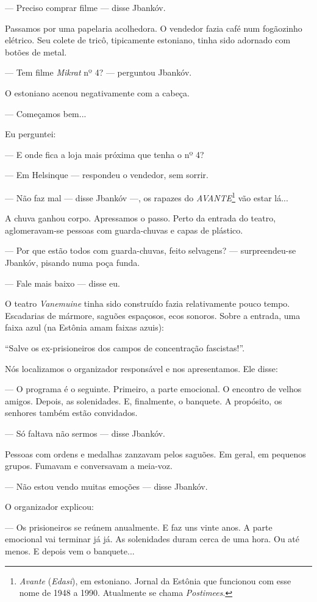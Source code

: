 --- Preciso comprar filme --- disse Jbankóv.

Passamos por uma papelaria acolhedora. O vendedor fazia café num
fogãozinho elétrico. Seu colete de tricô, tipicamente estoniano, tinha
sido adornado com botões de metal.

--- Tem filme \emph{Mikrat} nº 4? --- perguntou Jbankóv.

O estoniano acenou negativamente com a cabeça.

--- Começamos bem...

Eu perguntei:

--- E onde fica a loja mais próxima que tenha o nº 4?

--- Em Helsinque --- respondeu o vendedor, sem sorrir.

--- Não faz mal --- disse Jbankóv ---, os rapazes do
\emph{AVANTE}\footnote{\emph{Avante} (\emph{Edasi}), em estoniano.
  Jornal da Estônia que funcionou com esse nome de 1948 a 1990.
  Atualmente se chama \emph{Postimees}.} vão estar lá...

A chuva ganhou corpo. Apressamos o passo. Perto da entrada do teatro,
aglomeravam-se pessoas com guarda-chuvas e capas de plástico.

--- Por que estão todos com guarda-chuvas, feito selvagens? ---
surpreendeu-se Jbankóv, pisando numa poça funda.

--- Fale mais baixo --- disse eu.

O teatro \emph{Vanemuine} tinha sido construído fazia relativamente
pouco tempo. Escadarias de mármore, saguões espaçosos, ecos sonoros.
Sobre a entrada, uma faixa azul (na Estônia amam faixas azuis):

``Salve os ex-prisioneiros dos campos de concentração fascistas!''.

Nós localizamos o organizador responsável e nos apresentamos. Ele disse:

--- O programa é o seguinte. Primeiro, a parte emocional. O encontro de
velhos amigos. Depois, as solenidades. E, finalmente, o banquete. A
propósito, os senhores também estão convidados.

--- Só faltava não sermos --- disse Jbankóv.

Pessoas com ordens e medalhas zanzavam pelos saguões. Em geral, em
pequenos grupos. Fumavam e conversavam a meia-voz.

--- Não estou vendo muitas emoções --- disse Jbankóv.

O organizador explicou:

--- Os prisioneiros se reúnem anualmente. E faz uns vinte anos. A parte
emocional vai terminar já já. As solenidades duram cerca de uma hora. Ou
até menos. E depois vem o banquete...

